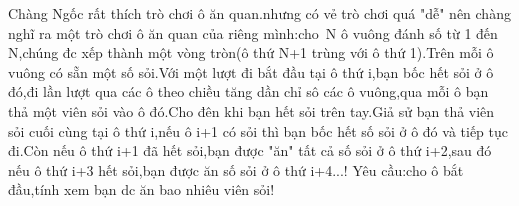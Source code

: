 Chàng Ngốc rất thích trò chơi ô ăn quan.nhưng có vẻ trò chơi quá "dễ" nên chàng nghĩ ra một trò chơi ô ăn quan của riêng mình:cho N ô vuông đánh số từ 1 đến N,chúng đc xếp thành một vòng tròn(ô thứ N+1 trùng với ô thứ 1).Trên mỗi ô vuông có sẵn một số sỏi.Với một lượt đi bắt đầu tại ô thứ i,bạn bốc hết sỏi ở ô đó,đi lần lượt qua các ô theo chiều tăng dần chỉ sô các ô vuông,qua mỗi ô bạn thả một viên sỏi vào ô đó.Cho đên khi bạn hết sỏi trên tay.Giả sử bạn thả viên sỏi cuối cùng tại ô thứ i,nếu ô i+1 có sỏi thì bạn bốc hết số sỏi ở ô đó và tiếp tục đi.Còn nếu ô thứ i+1 đã hết sỏi,bạn được "ăn" tất cả số sỏi ở ô thứ i+2,sau đó nếu ô thứ i+3 hết sỏi,bạn được ăn số sỏi ở ô thứ i+4...! Yêu cầu:cho ô bắt đầu,tính xem bạn dc ăn bao nhiêu viên sỏi!

\